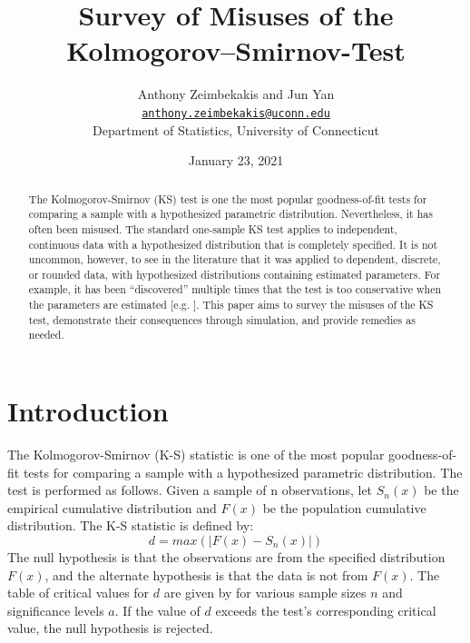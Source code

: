\documentclass[12pt, letterpaper, titlepage]{article}
\title{Survey of Misuses of the Kolmogorov–Smirnov-Test}
\author{Anthony Zeimbekakis and Jun Yan\\
\href{mailto:anthony.zeimbekakis@uconn.edu}{\nolinkurl{anthony.zeimbekakis@uconn.edu}}\\
Department of Statistics, University of Connecticut}
\date{January 23, 2021}
\begin{document}
\maketitle

\doublespace

\begin{abstract}
The Kolmogorov-Smirnov (KS) test is one the most popular goodness-of-fit tests for 
comparing a sample with a hypothesized parametric distribution. Nevertheless, it has 
often been misused. The standard one-sample KS test applies to independent, continuous 
data with a hypothesized distribution that is completely specified. It is not uncommon, 
however, to see in the literature that it was applied to dependent, discrete, or 
rounded data, with hypothesized distributions containing estimated parameters. 
For example, it has been “discovered” multiple times that the test is too conservative 
when the parameters are estimated [e.g. \citet{Steinskog}]. This paper aims to survey 
the misuses of the KS test, demonstrate their consequences through simulation, and 
provide remedies as needed.
\end{abstract}


\hypertarget{sec:intro}{%
\section{Introduction}\label{sec:intro}}

The Kolmogorov-Smirnov (K-S) statistic is one of the most popular goodness-of-fit 
tests for comparing a sample with a hypothesized parametric distribution. The test is 
performed as follows. Given a sample of n observations, let $S_{n}(x)$ be the empirical 
cumulative distribution and $F(x)$ be the population cumulative distribution. The K-S 
statistic is defined by: \[d = max(\lvert F(x)-S_{n}(x) \rvert)\] The null hypothesis 
is that the observations are from the specified distribution $F(x)$, and the 
alternate hypothesis is that the data is not from $F(x)$. The table of critical 
values for $d$ are given by \citet{Massey} for various sample sizes $n$ and significance 
levels $a$. If the value of $d$ exceeds the test's corresponding critical value, 
the null hypothesis is rejected.
\end{document}
